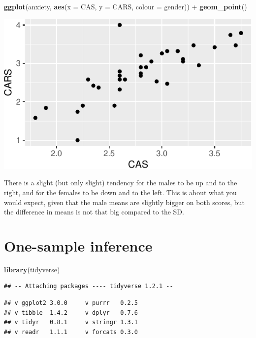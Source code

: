 \documentclass[]{tufte-book}
\newenvironment{Shaded}{}{}
\newcommand{\DataTypeTok}[1]{\textcolor[rgb]{0.56,0.13,0.00}{#1}}
\newcommand{\KeywordTok}[1]{\textcolor[rgb]{0.00,0.44,0.13}{\textbf{#1}}}
\newcommand{\NormalTok}[1]{#1}
\newcommand{\OperatorTok}[1]{\textcolor[rgb]{0.40,0.40,0.40}{#1}}
\newcommand{\StringTok}[1]{\textcolor[rgb]{0.25,0.44,0.63}{#1}}
\theoremstyle{definition}
\theoremstyle{definition}
\theoremstyle{definition}
\theoremstyle{remark}
\begin{document}
\begin{Shaded}
\begin{Highlighting}[]
\KeywordTok{ggplot}\NormalTok{(anxiety, }\KeywordTok{aes}\NormalTok{(}\DataTypeTok{x =}\NormalTok{ CAS, }\DataTypeTok{y =}\NormalTok{ CARS, }\DataTypeTok{colour =}\NormalTok{ gender)) }\OperatorTok{+}\StringTok{ }
\StringTok{    }\KeywordTok{geom_point}\NormalTok{()}
\end{Highlighting}
\end{Shaded}

\includegraphics{03-data-summaries_files/figure-latex/unnamed-chunk-54-1}

There is a slight (but only slight) tendency for the males to be up and
to the right, and for the females to be down and to the left. This is
about what you would expect, given that the male means are slightly
bigger on both scores, but the difference in means is not that big
compared to the SD.

\hypertarget{one-sample-inference}{%
\chapter{One-sample inference}\label{one-sample-inference}}

\begin{Shaded}
\begin{Highlighting}[]
\KeywordTok{library}\NormalTok{(tidyverse)}
\end{Highlighting}
\end{Shaded}

\begin{verbatim}
## -- Attaching packages ---- tidyverse 1.2.1 --
\end{verbatim}

\begin{verbatim}
## v ggplot2 3.0.0     v purrr   0.2.5
## v tibble  1.4.2     v dplyr   0.7.6
## v tidyr   0.8.1     v stringr 1.3.1
## v readr   1.1.1     v forcats 0.3.0
\end{verbatim}
\end{document}
